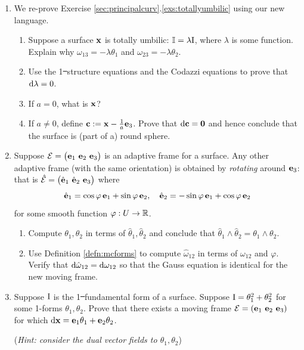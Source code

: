 \begin{exercises}{}{}
\begin{enumerate}
  
	\item We re-prove Exercise \ref*{sec:principalcurv}.\ref{exs:totallyumbilic} using our new language.
	\begin{enumerate}
	  \item Suppose a surface ${\mathbf{x}}$ is totally umbilic: $\mathbb{I}=\lambda\mathrm{I}$, where $\lambda$ is some function. Explain why $\omega_{13}=-\lambda\theta_1$ and $\omega_{23}=-\lambda\theta_2$. 
	  \item Use the 1\st\ structure equations and the Codazzi equations to prove that $\mathrm{d}\lambda=0$.
		\item If $a=0$, what is ${\mathbf{x}}$?
		\item If $a\neq 0$, define $\mathbf{c}:={\mathbf{x}}-\frac 1a{\mathbf{e}}_3$. Prove that $\mathrm{d}\mathbf{c}=\mathbf{0}$ and hence conclude that the surface is (part of a) round sphere.
	\end{enumerate}
	


  \item Suppose $\cE=\bigl(\ve_1\ \ve_2\ \ve_3\bigr)$ is an adaptive frame for a surface. Any other adaptive frame (with the same orientation) is obtained by \emph{rotating} around ${\mathbf{e}}_3$: that is $\hat{\cE}=\bigl(\hat\ve_1\ \hat\ve_2\ \ve_3\bigr)$ where
  \[\hat{{\mathbf{e}}}_1=\cos\varphi\,{\mathbf{e}}_1+\sin\varphi\,{\mathbf{e}}_2,\quad \hat{{\mathbf{e}}}_2=-\sin\varphi\,{\mathbf{e}}_1+\cos\varphi\,{\mathbf{e}}_2\]
  for some smooth function $\varphi:U\to\mathbb{R}$.
  \begin{enumerate}
    \item Compute $\theta_1,\theta_2$ in terms of $\hat\theta_1,\hat\theta_2$ and conclude that $\hat\theta_1\wedge\hat\theta_2=\theta_1\wedge\theta_2$.
    \item Use Definition \ref{defn:mcforms} to compute $\hat\omega_{12}$ in terms of $\omega_{12}$ and $\varphi$. Verify that $\mathrm{d}\hat\omega_{12}=\mathrm{d}\omega_{12}$ so that the Gauss equation is identical for the new moving frame.
  \end{enumerate}
  

\goodbreak
  
  \item Suppose $\mathrm{I}$ is the 1\st\ fundamental form of a surface. Suppose $\mathrm{I}=\theta_1^2+\theta_2^2$ for some 1-forms $\theta_1,\theta_2$. Prove that there exists a moving frame $\mathcal{E}=({\mathbf{e}}_1\ {\mathbf{e}}_2\ {\mathbf{e}}_3)$ for which $\mathrm{d}{\mathbf{x}}={\mathbf{e}}_1\theta_1+{\mathbf{e}}_2\theta_2$.\par
  (\emph{Hint: consider the dual vector fields to $\theta_1,\theta_2$})
  

\end{enumerate}
\end{exercises}
